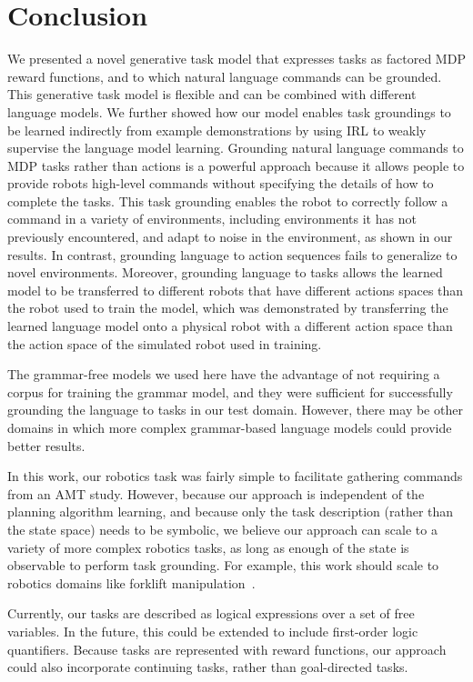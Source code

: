 \documentclass[conference]{IEEEtran}
\begin{document}
\section{Conclusion}
We presented a novel generative task model that expresses tasks as factored MDP reward functions, and to which natural language commands can be grounded. This generative task model is flexible and can be combined with different language models. We further showed how our model enables task groundings to be learned indirectly from example demonstrations by using IRL to weakly supervise the language model learning. Grounding natural language commands to MDP tasks rather than actions is a powerful approach because it allows people to provide robots high-level commands without specifying the details of how to complete the tasks. This task grounding enables the robot to correctly follow a command in a variety of environments, including environments it has not previously encountered, and adapt to noise in the environment, as shown in our results. In contrast, grounding language to action sequences fails to generalize to novel environments. Moreover, grounding language to tasks allows the learned model to be transferred to different robots that have different actions spaces than the robot used to train the model, which was demonstrated by transferring the learned language model onto a physical robot with a different action space than the action space of the simulated robot used in training.

The grammar-free models we used here have the advantage of not requiring a corpus for training the grammar model, and they were sufficient for successfully grounding the language to tasks in our test domain. However, there may be other domains in which more complex grammar-based language models could provide better results. 

In this work, our robotics task was fairly simple to facilitate gathering commands from an AMT study. However, because our approach is independent of the planning algorithm learning, and because only the task description (rather than the state space) needs to be symbolic, we believe our approach can scale to a variety of more complex robotics tasks, as long as enough of the state is observable to perform task grounding. For example, this work should scale to robotics domains like forklift manipulation~\cite{teller2010voice}.

Currently, our tasks are described as logical expressions over a set of free variables. In the future, this could be extended to include first-order logic quantifiers. Because tasks are represented with reward functions, our approach could also incorporate continuing tasks, rather than goal-directed tasks.
\end{document}

